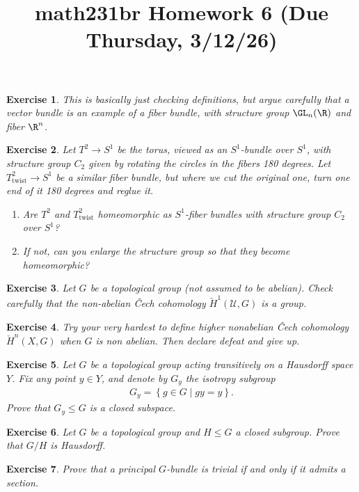 \documentclass[11pt]{amsart}
\title{math231br Homework 6 (Due Thursday, 3/12/26)}
\newtheorem{hwexercise}{Exercise}
\begin{document}
\maketitle


\begin{hwexercise} This is basically just checking definitions, but argue carefully that a vector bundle is an example of a fiber bundle, with structure group $\GL_n(\R)$ and fiber $\R^n$.
\end{hwexercise}

\begin{hwexercise} Let $T^2 \to S^1$ be the torus, viewed as an $S^1$-bundle over $S^1$, with structure group $C_2$ given by rotating the circles in the fibers 180 degrees. Let $T^2_\text{twist} \to S^1$ be a similar fiber bundle, but where we cut the original one, turn one end of it 180 degrees and reglue it.
\begin{enumerate}
    \item Are $T^2$ and $T^2_\text{twist}$ homeomorphic as $S^1$-fiber bundles with structure group $C_2$ over $S^1$?
    \item If not, can you enlarge the structure group so that they become homeomorphic?
\end{enumerate}
\end{hwexercise}




\begin{hwexercise} Let $G$ be a topological group (not assumed to be abelian). Check carefully that the non-abelian \v{C}ech cohomology $\check{H}^1(\mathcal{U},G)$ is a group.
\end{hwexercise}

\begin{hwexercise} Try your very hardest to define higher nonabelian \v{C}ech cohomology $\check{H}^n(X,G)$ when $G$ is non abelian. Then declare defeat and give up.
\end{hwexercise}

\begin{hwexercise} Let $G$ be a topological group acting transitively on a Hausdorff space $Y$. Fix any point $y\in Y$, and denote by $G_y$ the isotropy subgroup
\begin{align*}
    G_y = \left\{ g\in G \mid gy =y \right\}.
\end{align*}
Prove that $G_y \le G$ is a closed subspace.
\end{hwexercise}

\begin{hwexercise} Let $G$ be a topological group and $H \le G$ a closed subgroup. Prove that $G/H$ is Hausdorff.
\end{hwexercise}

\begin{hwexercise} Prove that a principal $G$-bundle is trivial if and only if it admits a section.
\end{hwexercise}
\end{document}
